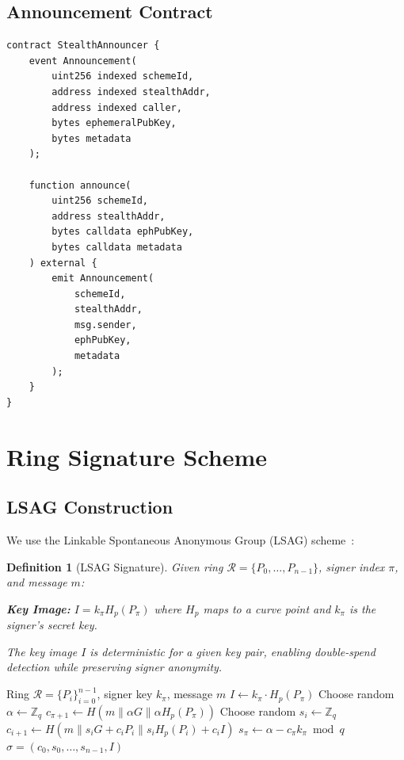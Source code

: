 \documentclass[11pt,a4paper]{article}
\newtheorem{definition}{Definition}[section]
\begin{document}
\subsection{Announcement Contract}

\begin{lstlisting}[language=Solidity,caption={Stealth Announcement Contract}]
contract StealthAnnouncer {
    event Announcement(
        uint256 indexed schemeId,
        address indexed stealthAddr,
        address indexed caller,
        bytes ephemeralPubKey,
        bytes metadata
    );

    function announce(
        uint256 schemeId,
        address stealthAddr,
        bytes calldata ephPubKey,
        bytes calldata metadata
    ) external {
        emit Announcement(
            schemeId,
            stealthAddr,
            msg.sender,
            ephPubKey,
            metadata
        );
    }
}
\end{lstlisting}

\section{Ring Signature Scheme}
\label{sec:ring}

\subsection{LSAG Construction}

We use the Linkable Spontaneous Anonymous Group (LSAG)
scheme~\cite{liu2004linkable}:

\begin{definition}[LSAG Signature]
    Given ring $\mathcal{R} = \{P_0, \ldots, P_{n-1}\}$, signer index
    $\pi$, and message $m$:

    \textbf{Key Image:} $I = k_\pi H_p(P_\pi)$ where $H_p$ maps to a
    curve point and $k_\pi$ is the signer's secret key.

    The key image $I$ is deterministic for a given key pair, enabling
    double-spend detection while preserving signer anonymity.
\end{definition}

\begin{algorithm}[H]
\caption{LSAG Ring Signature Generation}
\label{alg:lsag-sign}
\begin{algorithmic}[1]
\Require Ring $\mathcal{R} = \{P_i\}_{i=0}^{n-1}$, signer key $k_\pi$,
    message $m$
\State $I \gets k_\pi \cdot H_p(P_\pi)$ 
\State Choose random $\alpha \leftarrow \mathbb{Z}_q$
\State $c_{\pi+1} \gets H(m \| \alpha G \| \alpha H_p(P_\pi))$
    \State Choose random $s_i \leftarrow \mathbb{Z}_q$
    \State $c_{i+1} \gets H(m \| s_i G + c_i P_i \|
        s_i H_p(P_i) + c_i I)$
\EndFor
\State $s_\pi \gets \alpha - c_\pi k_\pi \bmod q$
\State \Return $\sigma = (c_0, s_0, \ldots, s_{n-1}, I)$
\end{algorithmic}
\end{algorithm}
\end{document}
